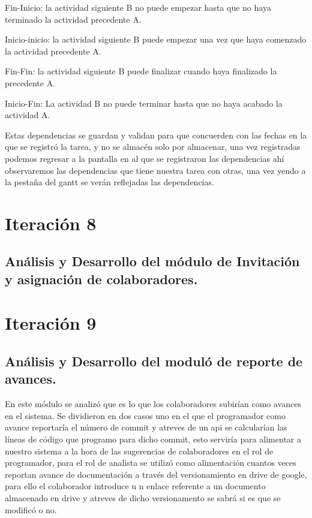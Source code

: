 Fin-Inicio: la actividad siguiente B no puede empezar hasta que no haya terminado la actividad precedente A. 

Inicio-inicio: la actividad siguiente B puede empezar una vez que haya comenzado la actividad precedente A. 

Fin-Fin: la actividad siguiente B puede finalizar cuando haya finalizado la precedente A. 

Inicio-Fin:  La actividad B no puede terminar hasta que no haya acabado la actividad A. 

Estas dependencias se guardan y validan para que concuerden con las fechas en la que se registró la tarea, y no se almacén solo por almacenar, una vez registradas podemos regresar a la pantalla en al que se registraron las dependencias ahí observaremos las dependencias que tiene nuestra tarea con otras, una vez yendo a la pestaña del gantt se verán reflejadas las dependencias.  

\section{Iteración 8}
\subsection{Análisis y Desarrollo del módulo de Invitación y asignación de colaboradores.}


\section{Iteración 9}
\subsection{Análisis y Desarrollo del moduló de reporte de avances.}

En este módulo se analizó que es lo que los colaboradores subirían como avances en el sistema. Se dividieron en dos casos uno en el que el programador como avance reportaría el número de commit y atreves de un api se calcularían las líneas de código que programo para dicho commit, esto serviría para alimentar a nuestro sistema a la hora de las sugerencias de colaboradores en el rol de programador, para el rol de analista se utilizó como alimentación cuantos veces reportan avance de documentación a través del versionamiento en drive de google, para ello el colaborador introduce u n enlace referente a un documento almacenado en drive y atreves de dicho versionamento se sabrá si es que se modificó o no. 

